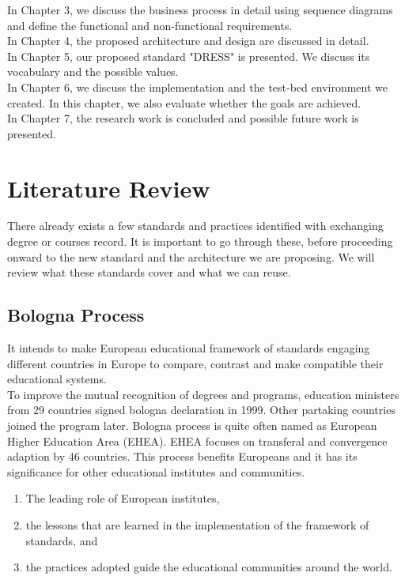 \documentclass[12pt,a4paper,oneside]{book}
\begin{document}
In Chapter 3, we discuss the business process in detail using sequence diagrams and define the functional and non-functional requirements.  \\

In Chapter 4, the proposed architecture and design are discussed in detail. \\

In Chapter 5, our proposed standard "DRESS" is presented. We discuss its vocabulary and the possible values. \\

In Chapter 6, we discuss the implementation and the test-bed environment we created. In this chapter, we also evaluate whether the goals are achieved. \\

In Chapter 7, the research work is concluded and possible future work is presented.

\chapter{Literature Review}\label{ch-work}

There already exists a few standards and practices identified with exchanging degree or courses record. It is important to go through these, before proceeding onward to the new standard and the architecture we are proposing. We will review what these standards cover and what we can reuse. \\

\section{Bologna Process}

It intends to make European educational framework of standards engaging different countries in Europe to compare, contrast and make compatible their educational systems. \cite{bologna process} \\

To improve the mutual recognition of degrees and programs, education ministers from 29 countries signed bologna declaration in 1999. Other partaking countries joined the program later. \cite{improvement bologna process} Bologna process is quite often named as European Higher Education Area (EHEA). EHEA focuses on transferal and convergence adaption by 46 countries. This process benefits Europeans and it has its significance for other educational institutes and communities.

	\begin{enumerate}

		\item The leading role of European institutes,

		\item the lessons that are learned in the implementation of the framework of standards, and
	
		\item the practices adopted guide the educational communities around the world.

	\end{enumerate} 
\end{document}
